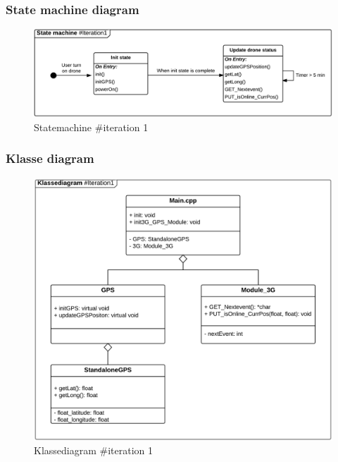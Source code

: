 \subsubsection*{State machine diagram}
\vspace{-0.1cm}

\begin{figure}[H]
	\centering
	\includegraphics[width=1\textwidth]{Billeder/statemachine/State_iteration1.png}
	\vspace{-0.5cm}
	\caption{Statemachine \#iteration 1}
	\label{fig:Statemachine_iteration1}
\end{figure}
\newpage

\subsubsection*{Klasse diagram}
\vspace{-0.1cm}

\begin{figure}[H]
	\centering
	\includegraphics[width=1\textwidth]{Billeder/klasse_diagrammer/classdiagram_iteration1.png}
	\vspace{-0.5cm}
	\caption{Klassediagram \#iteration 1}
	\label{fig:classDiagram_iteration1}
\end{figure}

